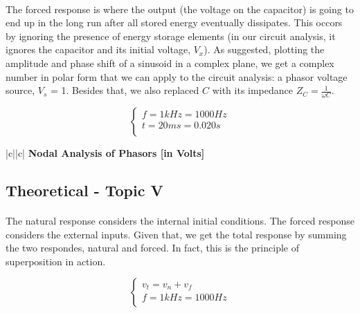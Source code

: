 \paragraph{}
The forced response is where the output (the voltage on the capacitor) is going to end up in the long run after all stored energy eventually dissipates. This occors by ignoring the presence of energy storage elements (in our circuit analysis, it ignores the capacitor and its initial voltage, $V_x$). As suggested, plotting the amplitude and phase shift of a sinusoid in a complex plane, we get a complex number in polar form that we can apply to the circuit analysis: a phasor voltage source, $V_s$ = 1. Besides that, we also replaced $C$ with its impedance $Z_C=\frac{1}{\omega C}$.


\[
\left\{\begin{matrix}
f = 1 kHz = 1000 Hz \\
t = 20 ms = 0.020 s \\
\end{matrix}\right.
\]


\begin{center}
   \begin{tabular}{|c||c|}
      \hline    
       {\bf Nodal Analysis of Phasors [in Volts]} \\
      \hline
        
   \end{tabular}
 \end{center}
 
\subsection{Theoretical - Topic V}
\label{subsec:fifth_topic}

\paragraph{}
The natural response considers the internal initial conditions. The forced response considers the external inputs. Given that, we get the total response by summing the two respondes, natural and forced. In fact, this is the principle of superposition in action.

\[
\left\{\begin{matrix}
v_t=v_n+v_f\\
f = 1 kHz = 1000 Hz \\
\end{matrix}\right.
\]

